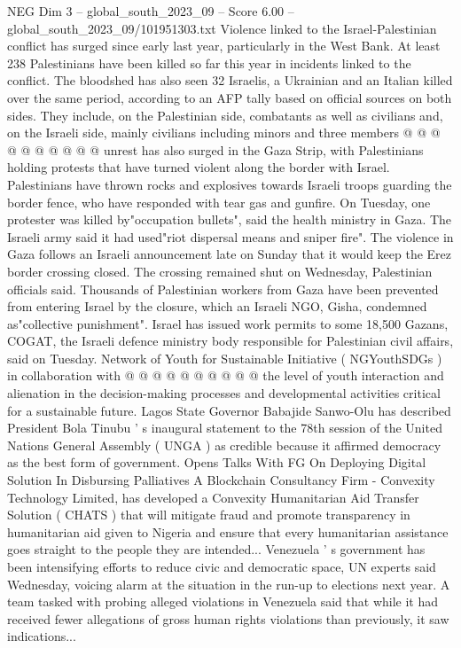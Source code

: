 \begin{textsample}{NEG Dim 3 – global\_south\_2023\_09 – Score 6.00 – global\_south\_2023\_09/101951303.txt}
Violence linked to the Israel-Palestinian conflict has surged since early last year, particularly in the West Bank.
At least 238 Palestinians have been killed so far this year in incidents linked to the conflict.
The bloodshed has also seen 32 Israelis, a Ukrainian and an Italian killed over the same period, according to an AFP tally based on official sources on both sides.
They include, on the Palestinian side, combatants as well as civilians and, on the Israeli side, mainly civilians including minors and three members @ @ @ @ @ @ @ @ @ @ unrest has also surged in the Gaza Strip, with Palestinians holding protests that have turned violent along the border with Israel.
Palestinians have thrown rocks and explosives towards Israeli troops guarding the border fence, who have responded with tear gas and gunfire.
On Tuesday, one protester was killed by"occupation bullets", said the health ministry in Gaza.
The Israeli army said it had used"riot dispersal means and sniper fire".
The violence in Gaza follows an Israeli announcement late on Sunday that it would keep the Erez border crossing closed.
The crossing remained shut on Wednesday, Palestinian officials said.
Thousands of Palestinian workers from Gaza have been prevented from entering Israel by the closure, which an Israeli NGO, Gisha, condemned as"collective punishment".
Israel has issued work permits to some 18,500 Gazans, COGAT, the Israeli defence ministry body responsible for Palestinian civil affairs, said on Tuesday.
Network of Youth for Sustainable Initiative ( NGYouthSDGs ) in collaboration with @ @ @ @ @ @ @ @ @ @ the level of youth interaction and alienation in the decision-making processes and developmental activities critical for a sustainable future.
Lagos State Governor Babajide Sanwo-Olu has described President Bola Tinubu ' s inaugural statement to the 78th session of the United Nations General Assembly ( UNGA ) as credible because it affirmed democracy as the best form of government.
Opens Talks With FG On Deploying Digital Solution In Disbursing Palliatives A Blockchain Consultancy Firm - Convexity Technology Limited, has developed a Convexity Humanitarian Aid Transfer Solution ( CHATS ) that will mitigate fraud and promote transparency in humanitarian aid given to Nigeria and ensure that every humanitarian assistance goes straight to the people they are intended...
Venezuela ' s government has been intensifying efforts to reduce civic and democratic space, UN experts said Wednesday, voicing alarm at the situation in the run-up to elections next year.
A team tasked with probing alleged violations in Venezuela said that while it had received fewer allegations of gross human rights violations than previously, it saw indications...

\end{textsample}
